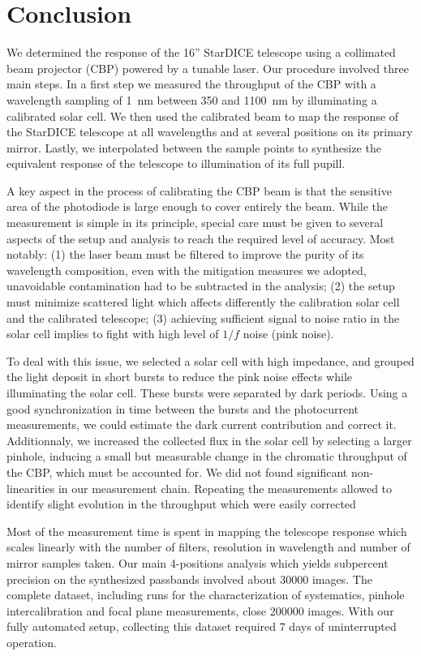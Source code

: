 \section{Conclusion}
\label{sec:discussion}

We determined the response of the 16'' StarDICE telescope using a
collimated beam projector (CBP) powered by a tunable laser. Our
procedure involved three main steps. In a first step we measured the
throughput of the CBP with a wavelength sampling of \SI{1}{nm} between
350 and \SI{1100}{nm} by illuminating a calibrated solar cell. We then
used the calibrated beam to map the response of the StarDICE telescope
at all wavelengths and at several positions on its primary
mirror. Lastly, we interpolated between the sample points to
synthesize the equivalent response of the telescope to illumination
of its full pupill.

A key aspect in the process of calibrating the CBP beam is that the
sensitive area of the photodiode is large enough to cover entirely the
beam. While the measurement is simple in its principle, special
care must be given to several aspects of the setup and analysis to
reach the required level of accuracy. Most notably: (1) the laser beam must be filtered to improve the purity of its wavelength
composition, even with the mitigation measures we adopted, unavoidable
contamination had to be subtracted in the analysis; (2) the setup must minimize scattered light which affects differently the calibration solar cell and the calibrated telescope; (3) achieving sufficient signal to noise ratio in the solar cell implies to fight with high level of $1/f$ noise (pink noise).

To deal with this issue, we selected a solar cell with high
impedance, and grouped the light deposit in short bursts to reduce the
pink noise effects while illuminating the solar cell.
These bursts were separated by dark periods. Using a good synchronization in time
between the bursts and the photocurrent measurements, 
we could estimate the dark current contribution and correct it.
Additionnaly, we increased the collected flux in the solar cell 
by selecting a larger pinhole, inducing a small but measurable change in the
chromatic throughput of the CBP, which must be accounted for.
We did not found significant non-linearities in our measurement
chain. Repeating the measurements allowed to identify slight
evolution in the throughput which were easily corrected

Most of the measurement time is spent in mapping the telescope
response which scales linearly with the number of filters,
resolution in wavelength and number of mirror samples taken. Our main
4-positions analysis which yields subpercent precision on the
synthesized passbands involved about \num{30000} images. The complete
dataset, including runs for the characterization of systematics,
pinhole intercalibration and focal plane measurements, close \num{200000}
images. With our fully automated setup, collecting this dataset required
7 days of uninterrupted operation. 

